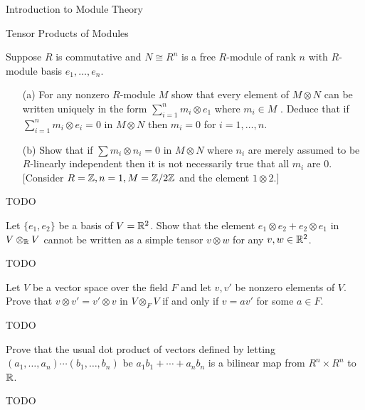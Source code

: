 \begin{chapter}{Introduction to Module Theory}
\begin{section}{Tensor Products of Modules}
\begin{solution}
\end{solution}\oneperpage



\begin{problem}\label{ex:10.4.10}
Suppose $R$ is commutative and $N\cong R^n$ is a free $R$-module of rank $n$ with $R$-module basis $e_1,\ldots,e_n$. \begin{enumerate}
\item[(a)] For any nonzero $R$-module $M$ show that every element of $M\otimes N$ can be written uniquely in the form $\sum_{i=1}^nm_i\otimes e_1$ where $m_i\in M$ . Deduce that if $\sum_{i=1}^n m_i\otimes e_i = 0$ in $M\otimes N$ then $m_i=0$ for $i=1,\ldots,n$. 
\item[(b)] Show that if $\sum m_i\otimes n_i = 0$ in $M\otimes N$ where $n_i$ are merely assumed to be $R$-linearly independent then it is not necessarily true that all $m_i$ are 0. [Consider $R=\mathbb{Z},n=1,M=\mathbb{Z}/2\mathbb{Z}$ and the element $1\otimes 2$.]
\end{enumerate}
\end{problem}
\begin{solution}TODO

\end{solution}\oneperpage



\begin{problem}\label{ex:10.4.11}
Let $\{e_1,e_2\}$ be a basis of $V=\mathbb{R}^2$. Show that the element $e_1\otimes e_2 + e_2\otimes e_1$ in $V\otimes_{\mathbb{R}} V$ cannot be written as a simple tensor $v\otimes w$ for any $v,w\in \mathbb{R}^2$. 
\end{problem}
\begin{solution}TODO

\end{solution}\oneperpage



\begin{problem}\label{ex:10.4.12}
Let $V$ be a vector space over the field $F$ and let $v,v'$ be nonzero elements of $V$. Prove that $v\otimes v' = v'\otimes v$ in $V\otimes_FV$ if and only if $v=av'$ for some $a\in F$.
\end{problem}
\begin{solution}TODO

\end{solution}\oneperpage



\begin{problem}\label{ex:10.4.13}
Prove that the usual dot product of vectors defined by letting $(a_1,\ldots,a_n)\cdots(b_1,\ldots,b_n)$ be $a_1b_1+\cdots+a_nb_n$ is a bilinear map from $R^n\times R^n$ to $\mathbb{R}$. 
\end{problem}
\begin{solution}TODO


\end{solution}
\end{section}
\end{chapter}
